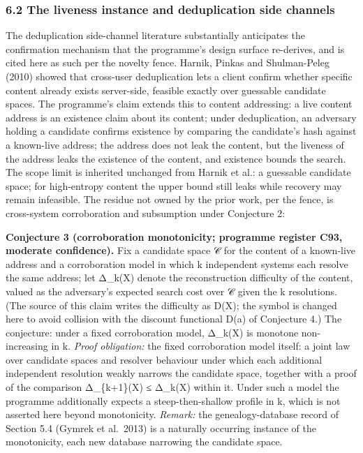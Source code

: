 \documentclass[
]{llncs}
\begin{document}
\subsubsection{6.2 The liveness instance and deduplication side
channels}\label{the-liveness-instance-and-deduplication-side-channels}

The deduplication side-channel literature substantially anticipates the
confirmation mechanism that the programme's design surface re-derives,
and is cited here as such per the novelty fence. Harnik, Pinkas and
Shulman-Peleg (2010) showed that cross-user deduplication lets a client
confirm whether specific content already exists server-side, feasible
exactly over guessable candidate spaces. The programme's claim extends
this to content addressing: a live content address is an existence claim
about its content; under deduplication, an adversary holding a candidate
confirms existence by comparing the candidate's hash against a
known-live address; the address does not leak the content, but the
liveness of the address leaks the existence of the content, and
existence bounds the search. The scope limit is inherited unchanged from
Harnik et al.: a guessable candidate space; for high-entropy content the
upper bound still leaks while recovery may remain infeasible. The
residue not owned by the prior work, per the fence, is cross-system
corroboration and subsumption under Conjecture 2:

\textbf{Conjecture 3 (corroboration monotonicity; programme register
C93, moderate confidence).} Fix a candidate space 𝒞 for the content of a
known-live address and a corroboration model in which k independent
systems each resolve the same address; let Δ\_k(X) denote the
reconstruction difficulty of the content, valued as the adversary's
expected search cost over 𝒞 given the k resolutions. (The source of this
claim writes the difficulty as D(X); the symbol is changed here to avoid
collision with the discount functional D(a) of Conjecture 4.) The
conjecture: under a fixed corroboration model, Δ\_k(X) is monotone
non-increasing in k. \emph{Proof obligation:} the fixed corroboration
model itself: a joint law over candidate spaces and resolver behaviour
under which each additional independent resolution weakly narrows the
candidate space, together with a proof of the comparison Δ\_\{k+1\}(X) ≤
Δ\_k(X) within it. Under such a model the programme additionally expects
a steep-then-shallow profile in k, which is not asserted here beyond
monotonicity. \emph{Remark:} the genealogy-database record of Section
5.4 (Gymrek et al.~2013) is a naturally occurring instance of the
monotonicity, each new database narrowing the candidate space.
\end{document}
